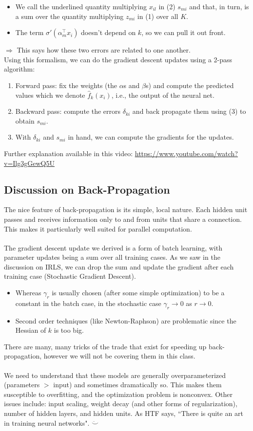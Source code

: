 \documentclass[a4paper]{article}
\begin{document}
\begin{itemize}
  \item We call the underlined quantity multiplying $x_{il}$ in (2)  $s_{mi}$ and that, in turn, is a sum over the quantity multiplying $z_{mi}$ in (1) over all $K$.
  \item The term $\sigma'(\alpha_m^\top x_i)$ doesn't depend on $k$, so we can pull it out front.
\end{itemize}
$\Rightarrow$ This says how these two errors are related to one another.\\
Using this formalism, we can do the gradient descent updates using a 2-pass algorithm:
\begin{enumerate}
  \item Forward pass: fix the weights (the $\alpha$s and $\beta$s) and compute the predicted values which we denote $\hat{f}_k (x_i)$, i.e., the output of the neural net.
  \item Backward pass: compute the errors $\delta_{ki}$ and back propagate them using (3) to obtain $s_{mi}$.
  \item With $\delta_{ki}$ and $s_{mi}$ in hand, we can compute the gradients for the updates.
\end{enumerate}
Further explanation available in this video: \url{https://www.youtube.com/watch?v=Ilg3gGewQ5U}
\subsection{Discussion on Back-Propagation}
The nice feature of back-propagation is its simple, local nature.  Each hidden unit passes and receives information only to and from units that share a connection. This makes it particularly well suited for parallel computation.\\ \\
The gradient descent update we derived is a form of batch learning, with parameter updates being a sum over all training cases.  As we saw in the discussion on IRLS, we can drop the sum and update the gradient after each training case (Stochastic Gradient Descent).
\begin{itemize}
  \item Whereas $\gamma_r$ is usually chosen (after some simple optimization) to be a constant in the batch case, in the stochastic case $\gamma_r \rightarrow 0$ as $r \rightarrow 0$.
  \item Second order techniques (like Newton-Raphson) are problematic since the Hessian of $k$ is too big.
\end{itemize}
There are many, many tricks of the trade that exist for speeding up back-propagation, however we will not be covering them in this class. \\ \\
We need to understand that these models are generally overparameterized (parameters $>$ input) and sometimes dramatically so. This makes them susceptible to overfitting, and the optimization problem is nonconvex.  Other issues include: input scaling, weight decay (and other forms of regularization), number of hidden layers, and hidden units.  As HTF says, ``There is quite an art in training neural networks". $\ddot\smile$
\end{document}
